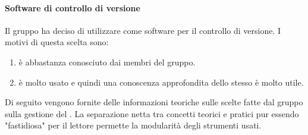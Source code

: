 \paragraph{Software di controllo di versione}
Il gruppo ha deciso di utilizzare  come software per il controllo di versione.
I motivi di questa scelta sono:
\begin{enumerate}
    \item {} è abbastanza conosciuto dai membri del gruppo.
    \item {} è molto usato e quindi una conoscenza approfondita dello stesso è molto utile.
\end{enumerate}
Di seguito vengono fornite delle informazioni teoriche sulle scelte fatte dal gruppo sulla gestione del .
La separazione netta tra concetti teorici e pratici pur essendo "fastidiosa" per il lettore permette la modularità degli strumenti usati.

